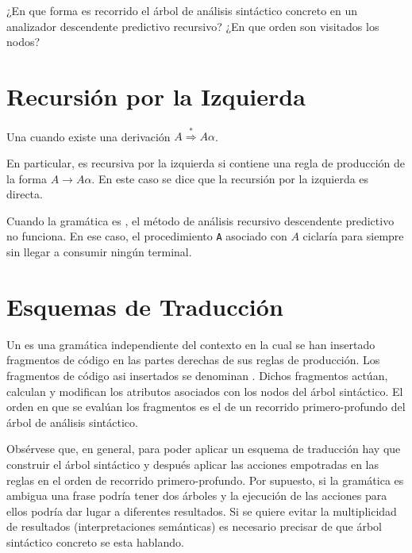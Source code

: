 ¿En que forma es recorrido el árbol de análisis sintáctico concreto en un 
analizador descendente predictivo recursivo? ¿En que orden son visitados los nodos?

\section{Recursión por la Izquierda}
\label{section:recursionizquierda}

\begin{definition}
Una  cuando existe una derivación
$A \stackrel{*}{\Longrightarrow} A \alpha$. 

En particular, es recursiva por la izquierda si contiene
una regla de producción de la forma $A \rightarrow A \alpha$. 
En este caso se dice que la recursión por la izquierda es directa.
\end{definition}

Cuando la gramática es , 
el método 
de análisis recursivo descendente predictivo no funciona. 
En ese caso, el procedimiento
\verb|A| asociado con $A$ ciclaría para siempre sin llegar a consumir ningún 
terminal. 


\section{Esquemas de Traducción}
\label{section:esquemas}
\begin{definition}
Un  es una gramática independiente del contexto
en la cual se han insertado fragmentos de código en las partes derechas
de sus reglas de producción. Los fragmentos de código asi insertados 
se denominan . Dichos fragmentos actúan, calculan
y modifican los atributos asociados con los nodos del árbol sintáctico. 
El orden en que se evalúan los fragmentos
es el de un recorrido primero-profundo del árbol de análisis sintáctico.
\end{definition}
Obsérvese que, en general, para poder aplicar un esquema de traducción hay 
que construir el árbol sintáctico y después aplicar las acciones empotradas
en las reglas en el orden de recorrido primero-profundo. Por supuesto, si 
la gramática es ambigua una frase podría tener dos árboles y la ejecución de las
acciones para ellos podría dar lugar a diferentes resultados. Si se quiere
evitar la multiplicidad de resultados (interpretaciones semánticas)
es necesario precisar de que árbol sintáctico concreto se esta hablando.

